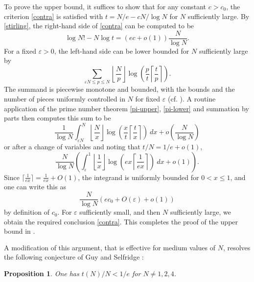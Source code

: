 \documentclass[12pt,a4paper,reqno]{amsart}
\numberwithin{equation}{section}
\theoremstyle{plain}
\newtheorem{proposition}[theorem]{Proposition}
\theoremstyle{definition}
\newcommand\eps{\varepsilon}
\begin{document}
To prove the upper bound, it suffices to show that for any constant $c > c_0$, the criterion \eqref{contra} is satisfied with $t = N/e - cN/\log N$ for $N$ sufficiently large.  By \eqref{stirling}, the right-hand side of \eqref{contra} can be computed to be
$$ \log N! - N \log t = (ec+o(1)) \frac{N}{\log N}.$$
For a fixed $\eps>0$, the left-hand side can be lower bounded for $N$ sufficiently large by
$$
\sum_{\eps N \leq p \leq N} \left\lfloor \frac{N}{p} \right\rfloor \log \left( \frac{p}{t} \left\lceil \frac{t}{p} \right\rceil \right).$$
The summand is piecewise monotone and bounded, with the bounds and the number of pieces uniformly controlled in $N$ for fixed $\eps$ (cf. ).  A routine application of the prime number theorem \eqref{pi-upper}, \eqref{pi-lower} and summation by parts then computes this sum to be
$$
\frac{1}{\log N} \int_{\eps N}^N \left\lfloor \frac{N}{x} \right\rfloor \log \left( \frac{x}{t} \left\lceil \frac{t}{x} \right\rceil \right)\ dx + o\left(\frac{N}{\log N} \right)$$
or after a change of variables and noting that $t/N = 1/e + o(1)$,
$$
\frac{N}{\log N} \left( \int_{\eps}^1 \left\lfloor \frac{1}{x} \right\rfloor \log \left( ex \left\lceil \frac{1}{ex} \right\rceil \right)\ dx + o(1) \right).
$$
Since $\lceil \frac{1}{ex} \rceil  = \frac{1}{ex} + O(1)$, the integrand is uniformly bounded for $0 < x \leq 1$, and one can write this as
$$
\frac{N}{\log N} (ec_0 + O(\eps) + o(1))
$$
by definition of $c_0$.  For $\eps$ sufficiently small, and then $N$ sufficiently large, we obtain the required conclusion \eqref{contra}.  This completes the proof of the upper bound in .

A modification of this argument, that is effective for medium values of $N$, resolves the following conjecture of Guy and Selfridge \cite{guy-selfridge}:

\begin{proposition}\label{tne} One has $t(N)/N < 1/e$ for $N \neq 1,2,4$.
\end{proposition}
\end{document}
